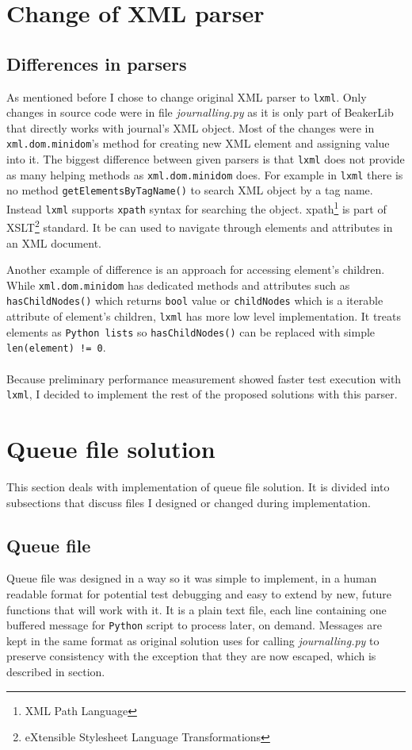 \section{Change of XML parser}
\subsection{Differences in parsers}
As mentioned before I chose to change original XML parser to \texttt{lxml}. Only changes in source code were in file \textit{journalling.py} as it is only part of BeakerLib that directly works with journal's XML object. 
Most of the changes were in \texttt{xml.dom.minidom}'s method for creating new XML element and assigning value into it.
The biggest difference between given parsers is that \texttt{lxml} does not provide as many helping methods as \texttt{xml.dom.minidom} does.
For example in \texttt{lxml}  there is no method \texttt{getElementsByTagName()} to search XML object by a tag name. Instead \texttt{lxml} supports \texttt{xpath}\cite{xpath} syntax for searching the object. xpath\footnote{XML Path Language} is part of XSLT\footnote{eXtensible Stylesheet Language Transformations} standard. It be can used to navigate through elements and attributes in an XML document.

Another example of difference is an approach for accessing element's children. While \texttt{xml.dom.minidom} has dedicated methods and attributes such as \texttt{hasChildNodes()} which returns \texttt{bool} value or \texttt{childNodes} which is a iterable attribute of element's children, \texttt{lxml} has more low level implementation. It treats elements as \texttt{Python lists} so \texttt{hasChildNodes()} can be replaced with simple \texttt{len(element) != 0}.
\\
\\
Because preliminary performance measurement showed faster test execution with \texttt{lxml}, I decided to implement the rest of the proposed solutions with this parser.

\section{Queue file solution}
This section deals with implementation of queue file solution. It is divided into subsections that discuss files I designed or changed during implementation. 

\subsection{Queue file}
Queue file was designed in a way so it was simple to implement, in a human readable format for potential test debugging and easy to extend by new, future functions that will work with it. 
It is a plain text file, each line containing one buffered message for \texttt{Python} script to process later, on demand. Messages are kept in the same format as original solution uses for calling \textit{journalling.py} to preserve consistency with the exception that they are now escaped, which is described in section.

